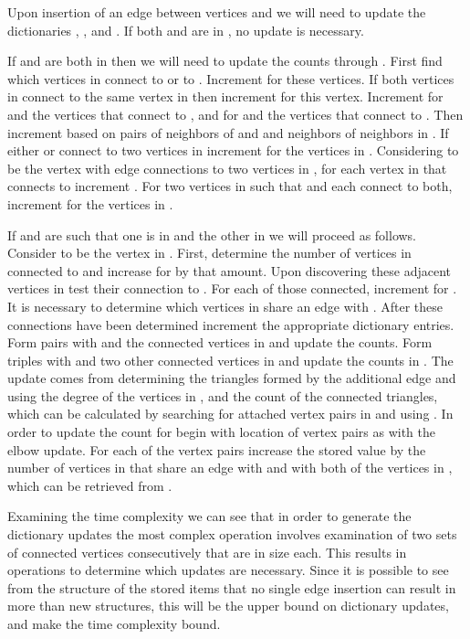 \documentclass[11pt]{article}
\begin{document}
Upon insertion of an edge between vertices  and  we will need to update the dictionaries , , and . If both  and  are in , no update is necessary.


If  and  are both in  then we will need to update the counts  through .  First find which vertices in  connect to  or to .  Increment  for these vertices.  If both vertices in  connect to the same vertex in  then increment  for this vertex.  Increment  for  and the vertices that connect to , and for  and the vertices that connect to .  Then increment  based on pairs of neighbors of  and  and neighbors of neighbors in .  If either  or  connect to two vertices in  increment  for the vertices in .  Considering  to be the vertex with edge connections to two vertices in , for each vertex in  that connects to  increment .  For two vertices in  such that  and  each connect to both, increment  for the vertices in .  

If  and  are such that one is in  and the other in  we will proceed as follows.  Consider  to be the vertex in . First, determine the number of vertices in  connected to  and increase  for  by that amount.  Upon discovering these adjacent vertices in  test their connection to .  For each of those connected, increment  for .  It is necessary to determine which vertices in  share an edge with .  After these connections have been determined increment the appropriate dictionary entries.  Form pairs with  and the connected vertices in  and update the  counts.  Form triples with  and two other connected vertices in  and update the counts in . The  update comes from determining the triangles formed by the additional edge and using the degree of the vertices in , and the count of the connected triangles, which can be calculated by searching for attached vertex pairs in  and using . In order to update the count for  begin with location of vertex pairs as with the elbow update.  For each of the  vertex pairs increase the stored value by the number of vertices in  that share an edge with  and with both of the vertices in , which can be retrieved from .


Examining the time complexity we can see that in order to generate the dictionary updates the most complex operation involves examination of two sets of connected vertices consecutively that are  in size each.  This results in  operations to determine which updates are necessary.  Since it is possible to see from the structure of the stored items that no single edge insertion can result in more than  new structures, this will be the upper bound on dictionary updates, and make  the time complexity bound.
\end{document}
